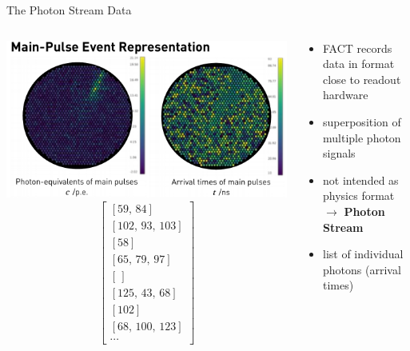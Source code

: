 \begin{frame}[c]{The Photon Stream Data}
\begin{columns}[onlytextwidth]
    \begin{column}{0.475\textwidth}
        \begin{overprint}
              \vspace{\fill}
              \includegraphics[width=1.15\textwidth]{fig/standard.png}
              \vspace{\fill}
              \begin{equation*}
                  \begin{bmatrix}
                      [59,\,84] \\
                       [102,\,93,\,103] \\
                       [58] \\
                       [65,\,79,\,97] \\
                       [\,] \\
                       [125,\,43,\,68] \\
                       [102] \\
                       [68,\,100,\,123] \\
                       \cdots
                \end{bmatrix}
            \end{equation*}
        \end{overprint}
  \end{column}
  \begin{column}{0.475\textwidth}
      \begin{itemize}
          \item FACT records data in format close to readout hardware
          \item superposition of multiple photon signals
          \item not intended as physics format \\ $\rightarrow$ \textbf{Photon Stream}
          \item list of individual photons (arrival times)
      \end{itemize}
  \end{column}
\end{columns}

\end{frame}

